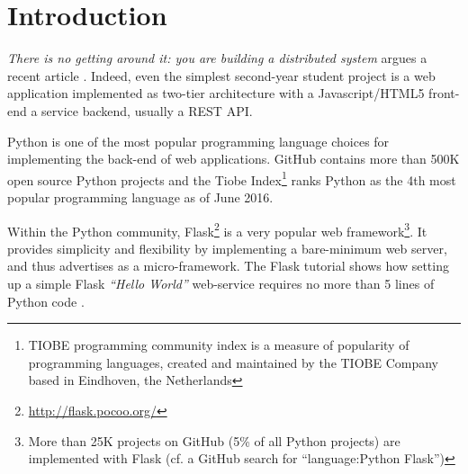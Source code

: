 \documentclass{sig-alternate-05-2015}
\begin{document}



\section{Introduction}



{\em There is no getting around it: you are building a distributed system} argues a recent article \cite{cavage2013there}. Indeed, even the simplest second-year student project is a web application implemented as two-tier architecture with a Javascript/HTML5 front-end a service backend, usually a REST API.

Python is one of the most popular programming language choices for implementing the back-end of web applications. GitHub contains more than 500K open source Python projects and the Tiobe Index\footnote{TIOBE programming community index is a measure of popularity of programming languages, created and maintained by the TIOBE Company based in Eindhoven, the Netherlands} ranks Python as the 4th most popular programming language as of June 2016.
 
Within the Python community, Flask\footnote{\url{http://flask.pocoo.org/}} is a very popular web framework\footnote{More than 25K projects on GitHub (5\% of all Python projects) are implemented with Flask (cf. a GitHub search for ``language:Python Flask'')}. It provides simplicity and flexibility by implementing a bare-minimum web server, and thus advertises as a micro-framework. The Flask tutorial shows how setting up a simple Flask {\em ``Hello World''} web-service requires no more than 5 lines of Python code \cite{ flask:tutorial}.
 
\end{document}
